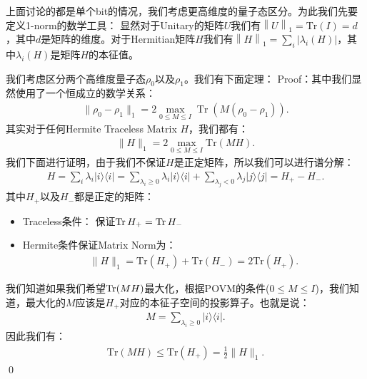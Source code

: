 上面讨论的都是单个bit的情况，我们考虑更高维度的量子态区分。为此我们先要定义1-norm的数学工具：
显然对于Unitary的矩阵$ U $我们有$ \left\|U\right\|_1=\mathrm{Tr}(I)=d $，其中$ d
$是矩阵的维度。对于Hermitian矩阵$ H $我们有$
\left\|H\right\|_1=\sum_i|\lambda_i(H)| $，其中$ \lambda_i(H) $是矩阵$ H $的本征值。

\bigskip
{}

我们考虑区分两个高维度量子态$ \rho_0 $以及$ \rho_1 $。我们有下面定理：
Proof：其中我们显然使用了一个恒成立的数学关系：
\begin{align}
  \|\rho_0-\rho_1\|_1=2\max_{0\leq M\leq
  I}\operatorname{Tr}(M(\rho_0-\rho_1)).
\end{align}
其实对于任何Hermite Traceless Matrix $ H $，我们都有：
\begin{align}
  \|H\|_1=2\max_{0\leq M\leq I}\mathrm{Tr}(MH).
\end{align}
我们下面进行证明，由于我们不保证$ H $是正定矩阵，所以我们可以进行谱分解：
\begin{align}
  H=\sum_{i}\lambda_i |i\rangle\langle i|=\sum_{\lambda_i\geq0}\lambda_i
  |i\rangle\langle i|+\sum_{\lambda_j<0}\lambda_j |j\rangle\langle j|=H_+-H_-.
\end{align}
其中$ H_+ $以及$ H_- $都是正定的矩阵：
\begin{itemize}
  \item Traceless条件： 保证$ \operatorname{Tr} H_+ = \operatorname{Tr} H_- $
  \item Hermite条件保证Matrix Norm为：
    \begin{align}
      \|H\|_1=\mathrm{Tr}(H_+)+\mathrm{Tr}(H_-)=2\mathrm{Tr}(H_+).
    \end{align}
\end{itemize}
我们知道如果我们希望$ \operatorname{Tr} (M H) $最大化，根据POVM的条件($ 0\leq M\leq I $)，我们知道，最大化的$ M
$应该是$ H_+ $对应的本征子空间的投影算子。也就是说：
\begin{align}
  M=\sum_{\lambda_i\geq0}|i\rangle\langle i|.
\end{align}
因此我们有：
\begin{align}
  \mathrm{Tr}(MH)\leq\mathrm{Tr}(H_+) = \displaystyle\frac{1}{2} \|H\|_1.
\end{align}
\qed

